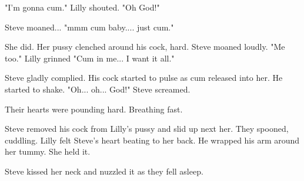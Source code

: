 "I'm gonna cum." Lilly shouted. "Oh God!"

Steve moaned... "mmm cum baby.... just cum."

She did. Her pussy clenched around his cock, hard. Steve moaned loudly. "Me too." Lilly grinned "Cum in me... I want it all."

Steve gladly complied. His cock started to pulse as cum released into her. He started to shake. "Oh... oh... God!" Steve screamed.

Their hearts were pounding hard. Breathing fast.

Steve removed his cock from Lilly's pussy and slid up next her. They spooned, cuddling. Lilly felt Steve's heart beating to her back. He wrapped his arm around her tummy. She held it.

Steve kissed her neck and nuzzled it as they fell asleep.

